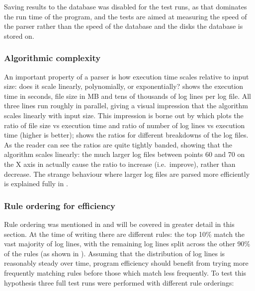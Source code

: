 Saving results to the database was disabled for the test runs, as that
dominates the run time of the program, and the tests are aimed at measuring
the speed of the parser rather than the speed of the database and the disks
the database is stored on.

\subsubsection{Algorithmic complexity}

An important property of a parser is how execution time scales relative to
input size: does it scale linearly, polynomially, or exponentially?
shows the execution time in seconds, file size in MB and tens of thousands
of log lines per log file.  All three lines run roughly in parallel, giving
a visual impression that the algorithm scales linearly with input size.
This impression is borne out by  which plots the ratio of file size vs
execution time and ratio of number of log lines vs execution time (higher
is better);  shows the ratios for different breakdowns of the log files.
As the reader can see the ratios are quite tightly banded, showing that the
algorithm scales linearly: the much larger log files between points 60 and
70 on the X axis in  actually cause the ratio to increase (i.e.\
improve), rather than decrease.  The strange behaviour where larger log
files are parsed more efficiently is explained fully in \sectionref{Why are
there dips in the graphs?}.  

\subsubsection{Rule ordering for efficiency}

\label{rule ordering for efficiency}

Rule ordering was mentioned in  and will be
covered in greater detail in this section.  At the time of writing there
are \numberOFrules{} different rules: the top 10\% match the vast majority
of log lines, with the remaining log lines split across the other 90\% of
the rules (as shown in \graphref{rule hits graph}).  Assuming that
the distribution of log lines is reasonably steady over time, program
efficiency should benefit from trying more frequently matching rules before
those which match less frequently.  To test this hypothesis three full test
runs were performed with different rule orderings:

